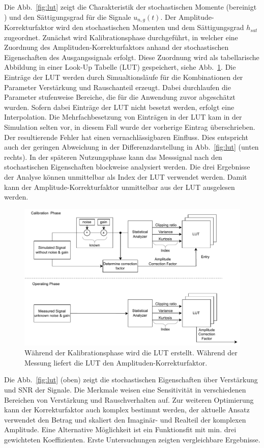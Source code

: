 Die Abb.~\ref{fig:lut} zeigt die Charakteristik der stochastischen Momente (bereinigt ) und den Sättigungsgrad für die Signale $u_{n,g}(t)$. 
Der Amplitude-Korrekturfaktor wird den stochastischen Momenten und dem Sättigungsgrad $h_{sat}$ zugeordnet. Zunächst wird Kalibrationsphase durchgeführt, in welcher eine Zuordnung des Amplituden-Korrekturfaktors anhand der stochastischen Eigenschaften des Ausgangssignals erfolgt. Diese Zuordnung wird als tabellarische Abbildung in einer Look-Up Tabelle (LUT) gespeichert, siehe Abb.~\ref{fig:factor_eval}. 
Die Einträge der LUT werden durch Simualtionsläufe für die Kombinationen der Parameter Verstärkung und Rauschanteil erzeugt. Dabei durchlaufen die Parameter stufenweise Bereiche, die für die Anwendung zuvor abgeschätzt wurden. Sofern dabei Einträge der LUT nicht besetzt werden, erfolgt eine Interpolation. %
Die Mehrfachbesetzung von Einträgen in der LUT kam in der Simulation selten vor, in diesem Fall wurde der vorherige Eintrag überschrieben. Der resultierende Fehler hat einen vernachlässigbaren Einfluss. Dies entspricht auch der geringen Abweichung in der Differenzdarstellung in Abb.~\ref{fig:lut} (unten rechts). In der späteren Nutzungsphase kann das Messsignal nach den stochastischen Eigenschaften blockweise analysiert werden. Die drei Ergebnisse der Analyse können unmittelbar als Index der LUT verwendet werden. Damit kann der Amplitude-Korrekturfaktor unmittelbar aus der LUT ausgelesen werden.
\begin{figure}[th!]
	\centering
	\includegraphics[width=.9\textwidth]{../img/factor.pdf}
	\caption{Während der Kalibrationsphase wird die LUT erstellt. Während der Messung liefert die LUT den Amplituden-Korrekturfaktor.}
	\label{fig:factor_eval} 
\end{figure}
Die Abb.~\ref{fig:lut} (oben) zeigt die stochastischen Eigenschaften über Verstärkung und SNR der Signale. Die Merkmale weisen eine Sensitivität in verschiedenen Bereichen von Verstärkung und Rauschverhalten auf. Zur weiteren Optimierung kann der Korrekturfaktor auch komplex bestimmt werden, der aktuelle Ansatz verwendet den Betrag und skaliert den Imaginär- und Realteil der komplexen Amplitude. Eine Alternative Möglichkeit ist ein Funktionsfit mit min. drei gewichteten Koeffizienten. Erste Untersuchungen zeigten vergleichbare Ergebnisse.


